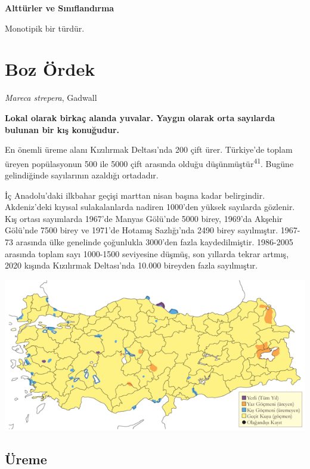 \documentclass[
  letterpaper,
  DIV=11,
  numbers=noendperiod]{scrreprt}
\begin{document}
\textbf{Alttürler ve Sınıflandırma}

Monotipik bir türdür.

\hypertarget{boz-uxf6rdek}{%
\section{Boz Ördek}\label{boz-uxf6rdek}}

\emph{Mareca strepera}, Gadwall

\textbf{Lokal olarak birkaç alanda yuvalar. Yaygın olarak orta sayılarda
bulunan bir kış konuğudur.}

En önemli üreme alanı Kızılırmak Deltası'nda 200 çift ürer. Türkiye'de
toplam üreyen popülasyonun 500 ile 5000 çift arasında olduğu
düşünmüştür\textsuperscript{41}. Bugüne gelindiğinde sayılarının
azaldığı ortadadır.

İç Anadolu'daki ilkbahar geçişi marttan nisan başına kadar belirgindir.
Akdeniz'deki kıyısal sulakalanlarda nadiren 1000'den yüksek sayılarda
gözlenir. Kış ortası sayımlarda 1967'de Manyas Gölü'nde 5000 birey,
1969'da Akşehir Gölü'nde 7500 birey ve 1971'de Hotamış Sazlığı'nda 2490
birey sayılmıştır. 1967-73 arasında ülke genelinde çoğunlukla 3000'den
fazla kaydedilmiştir. 1986-2005 arasında toplam sayı 1000-1500
seviyesine düşmüş, son yıllarda tekrar artmış, 2020 kışında Kızılırmak
Deltası'nda 10.000 bireyden fazla sayılmıştır.

\includegraphics{images/harita_Page_014.png}

\hypertarget{uxfcreme-13}{%
\subsection{\texorpdfstring{\textbf{Üreme}}{Üreme}}\label{uxfcreme-13}}
\end{document}
